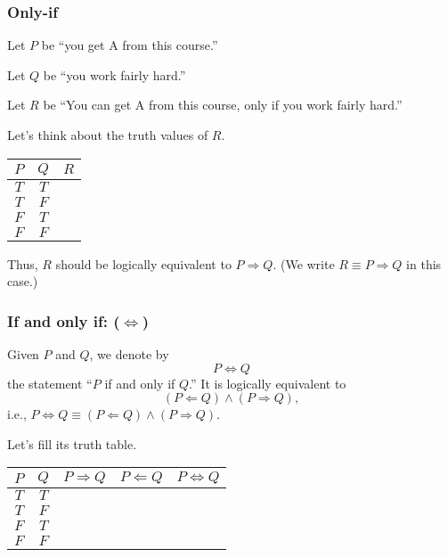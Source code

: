 \documentclass{beamer}
\begin{document}
\begin{frame}\frametitle{Only-if}
  Let $P$ be ``you get A from this course.''

  Let $Q$ be ``you work fairly hard.''
  
  Let $R$ be ``You can get A from this course, only if you work fairly hard.''

  Let's think about the truth values of $R$.
  
  \begin{tcolorbox}[title=Only if you work fairly hard.]
    \begin{tabular}{|c|c||c|}
      \hline
      $P$ & $Q$ & $R$ \\
      \hline
      $T$ & $T$ & \\
      $T$ & $F$ & \\
      $F$ & $T$ & \\
      $F$ & $F$ & \\
      \hline
    \end{tabular}
  \end{tcolorbox}
  \pause

  Thus, $R$ should be logically equivalent to $P\Rightarrow Q$.  (We
  write $R\equiv P\Rightarrow Q$ in this case.)
\end{frame}

\begin{frame}\frametitle{If and only if: ($\Leftrightarrow$)}
  Given $P$ and $Q$, we denote by
  \[ P\Leftrightarrow Q \]
  the statement ``$P$ if and only if $Q$.''
  \pause
  It is logically equivalent to
  \[ (P\Leftarrow Q)\wedge (P\Rightarrow Q), \]
  i.e., $P\Leftrightarrow Q \equiv (P\Leftarrow Q)\wedge (P\Rightarrow Q)$.

  Let's fill its truth table.
  \begin{tcolorbox}
    \begin{tabular}{|c|c||c|c|c|}
      \hline
      $P$ & $Q$ & $P\Rightarrow Q$ & $P\Leftarrow Q$ & $P\Leftrightarrow Q$ \\
      \hline
      $T$ & $T$ & & & \\
      $T$ & $F$ & & & \\
      $F$ & $T$ & & & \\
      $F$ & $F$ & & & \\
      \hline
    \end{tabular}
  \end{tcolorbox}
\end{frame}
\end{document}
